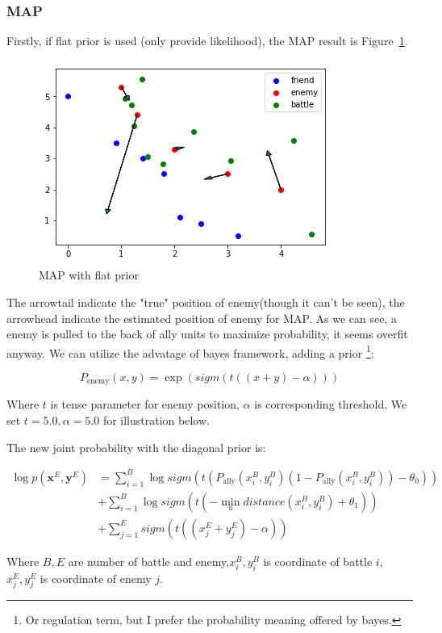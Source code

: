 \documentclass{article}
\begin{document}
\subsubsection{MAP}

Firstly, if flat prior is used (only provide likelihood), the MAP result is Figure~\ref{fig:MAPone}.

\begin{figure}[h]
\includegraphics[width=0.6\linewidth]{MAP1.png}
\caption{MAP with flat prior}
\label{fig:MAPone}
\end{figure}

The arrowtail indicate the "true" position of enemy(though it can't be seen), 
the arrowhead indicate the estimated position of enemy for MAP. As we can see,
a enemy is pulled to the back of ally units to maximize probability, it seems overfit anyway.
We can utilize the advatage of bayes framework, adding a prior \footnote{Or regulation term, but I
prefer the probability meaning offered by bayes.}:


$$
P_{\text{enemy}}(x,y) = \exp(sigm(t((x+y) - \alpha)))
$$

Where $t$ is tense parameter for enemy position,
$\alpha$ is corresponding threshold. We set $t=5.0,\alpha=5.0$
for illustration below.

The new joint probability with the diagonal prior is:

\begin{align*}
\log p(\mathbf{x}^E,\mathbf{y}^E) &= \sum_{i=1}^B \log sigm(t (P_\text{ally}(x^B_i,y^B_i)(1-P_\text{ally}(x^B_i,y^B_i)) - \theta_0)) \\
                                  &+ \sum_{i=1}^B \log sigm(t(-\min_{u} distance(x^B_i,y^B_i) + \theta_1)) \\
                                  &+ \sum_{j=1}^E sigm(t((x^E_j+y^E_j) - \alpha))
\end{align*}

Where $B,E$ are number of battle and enemy,$x^B_i,y^B_i$ is coordinate of battle $i$, $x^E_j,y^E_j$
is coordinate of enemy $j$.
\end{document}
